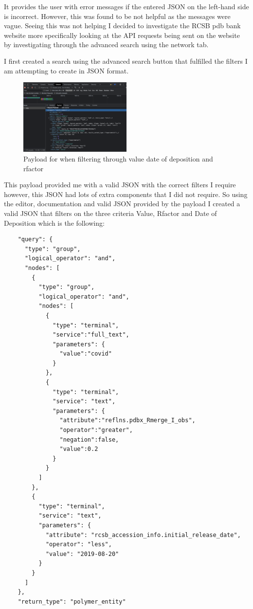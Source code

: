 \documentclass[]{final_report}
\begin{document}
It provides the user with error messages if the entered JSON on the left-hand side is incorrect. However, this was found to be not helpful as the messages were vague. Seeing this was not helping I decided to investigate the RCSB pdb bank website more specifically looking at the API requests being sent on the website by investigating through the advanced search using the network tab.

I first created a search using the advanced search button that fulfilled the filters I am attempting to create in JSON format.

\begin{figure}[ht]
    \centering
    \includegraphics[width=0.5\textwidth]{payload.png}
    \caption{\label{fig:payload}Payload for when filtering through value date of deposition and rfactor}
\end{figure}

\clearpage

This payload provided me with a valid JSON with the correct filters I require however, this JSON had lots of extra components that I did not require. So using the editor, documentation and valid JSON provided by the payload I created a valid JSON that filters on the three criteria Value, Rfactor and Date of Deposition which is the following:

\vspace{30px}

\begin{lstlisting}
    "query": {
      "type": "group",
      "logical_operator": "and",
      "nodes": [
        {
          "type": "group",
          "logical_operator": "and",
          "nodes": [
            {
              "type": "terminal",
              "service":"full_text",
              "parameters": {
                "value":"covid"
              }
            },
            {
              "type": "terminal",
              "service": "text",
              "parameters": {
                "attribute":"reflns.pdbx_Rmerge_I_obs",
                "operator":"greater",
                "negation":false,
                "value":0.2
              }
            }
          ]
        },
        {
          "type": "terminal",
          "service": "text",
          "parameters": {
            "attribute": "rcsb_accession_info.initial_release_date",
            "operator": "less",
            "value": "2019-08-20"
          }
        }
      ]
    },
    "return_type": "polymer_entity"
\end{lstlisting}
\end{document}
